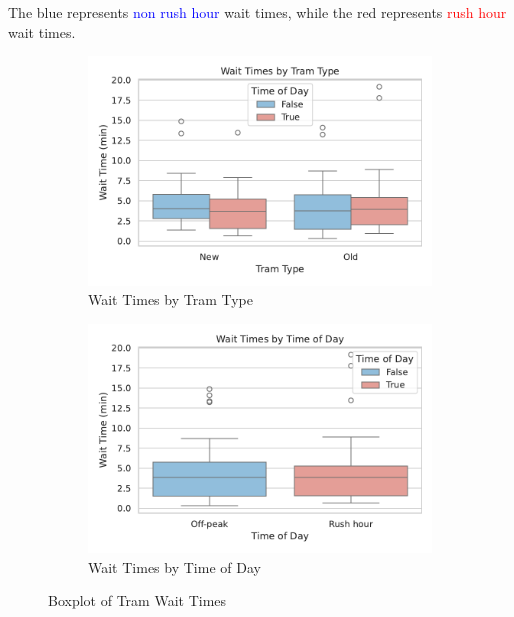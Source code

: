 \documentclass[a4paper, 10pt]{article}
\begin{document}
				\noindent The blue represents \textcolor{blue}{non rush hour} wait times, while the red 
				represents \textcolor{red}{rush hour} wait times.

				\begin{figure}[h!]
					\centering
					\begin{subfigure}[b]{0.48\textwidth}
						\centering
						\includegraphics[width=\textwidth]{Plot_WaitTimesByTramType.pdf}
						\caption{Wait Times by Tram Type}
						\label{fig:wait_time_by_tram_type}
					\end{subfigure}
					\hfill
					\begin{subfigure}[b]{0.48\textwidth}
						\centering
						\includegraphics[width=\textwidth]{Plot_WaitTimesByTimeOfDay.pdf}
						\caption{Wait Times by Time of Day}
						\label{fig:wait_time_by_time_of_day}
					\end{subfigure}
						
					\caption{Boxplot of Tram Wait Times}
					\label{fig:wait_time_boxplots}
				\end{figure}
\end{document}

